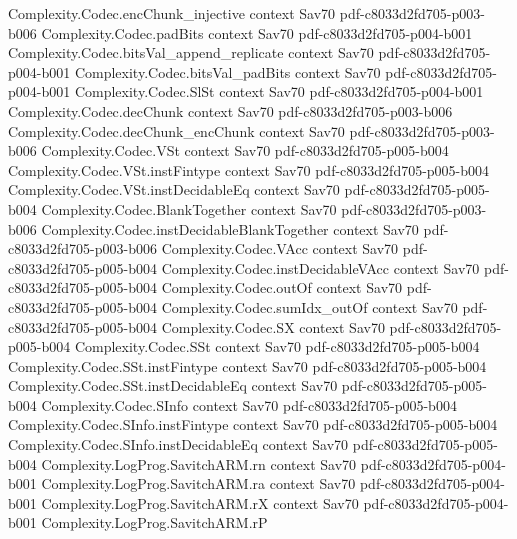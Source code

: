\begin{theorem}
  {Complexity.Codec.encChunk_injective}
  {context}
  {Sav70}
  {pdf-c8033d2fd705-p003-b006}
\proofstep
  {Complexity.Codec.padBits}
  {context}
  {Sav70}
  {pdf-c8033d2fd705-p004-b001}
\proofstep
  {Complexity.Codec.bitsVal_append_replicate}
  {context}
  {Sav70}
  {pdf-c8033d2fd705-p004-b001}
\proofstep
  {Complexity.Codec.bitsVal_padBits}
  {context}
  {Sav70}
  {pdf-c8033d2fd705-p004-b001}
\proofstep
  {Complexity.Codec.SlSt}
  {context}
  {Sav70}
  {pdf-c8033d2fd705-p004-b001}
\proofstep
  {Complexity.Codec.decChunk}
  {context}
  {Sav70}
  {pdf-c8033d2fd705-p003-b006}
\proofstep
  {Complexity.Codec.decChunk_encChunk}
  {context}
  {Sav70}
  {pdf-c8033d2fd705-p003-b006}
\proofstep
  {Complexity.Codec.VSt}
  {context}
  {Sav70}
  {pdf-c8033d2fd705-p005-b004}
\proofstep
  {Complexity.Codec.VSt.instFintype}
  {context}
  {Sav70}
  {pdf-c8033d2fd705-p005-b004}
\proofstep
  {Complexity.Codec.VSt.instDecidableEq}
  {context}
  {Sav70}
  {pdf-c8033d2fd705-p005-b004}
\proofstep
  {Complexity.Codec.BlankTogether}
  {context}
  {Sav70}
  {pdf-c8033d2fd705-p003-b006}
\proofstep
  {Complexity.Codec.instDecidableBlankTogether}
  {context}
  {Sav70}
  {pdf-c8033d2fd705-p003-b006}
\proofstep
  {Complexity.Codec.VAcc}
  {context}
  {Sav70}
  {pdf-c8033d2fd705-p005-b004}
\proofstep
  {Complexity.Codec.instDecidableVAcc}
  {context}
  {Sav70}
  {pdf-c8033d2fd705-p005-b004}
\proofstep
  {Complexity.Codec.outOf}
  {context}
  {Sav70}
  {pdf-c8033d2fd705-p005-b004}
\proofstep
  {Complexity.Codec.sumIdx_outOf}
  {context}
  {Sav70}
  {pdf-c8033d2fd705-p005-b004}
\proofstep
  {Complexity.Codec.SX}
  {context}
  {Sav70}
  {pdf-c8033d2fd705-p005-b004}
\proofstep
  {Complexity.Codec.SSt}
  {context}
  {Sav70}
  {pdf-c8033d2fd705-p005-b004}
\proofstep
  {Complexity.Codec.SSt.instFintype}
  {context}
  {Sav70}
  {pdf-c8033d2fd705-p005-b004}
\proofstep
  {Complexity.Codec.SSt.instDecidableEq}
  {context}
  {Sav70}
  {pdf-c8033d2fd705-p005-b004}
\proofstep
  {Complexity.Codec.SInfo}
  {context}
  {Sav70}
  {pdf-c8033d2fd705-p005-b004}
\proofstep
  {Complexity.Codec.SInfo.instFintype}
  {context}
  {Sav70}
  {pdf-c8033d2fd705-p005-b004}
\proofstep
  {Complexity.Codec.SInfo.instDecidableEq}
  {context}
  {Sav70}
  {pdf-c8033d2fd705-p005-b004}
\proofstep
  {Complexity.LogProg.SavitchARM.rn}
  {context}
  {Sav70}
  {pdf-c8033d2fd705-p004-b001}
\proofstep
  {Complexity.LogProg.SavitchARM.ra}
  {context}
  {Sav70}
  {pdf-c8033d2fd705-p004-b001}
\proofstep
  {Complexity.LogProg.SavitchARM.rX}
  {context}
  {Sav70}
  {pdf-c8033d2fd705-p004-b001}
\proofstep
  {Complexity.LogProg.SavitchARM.rP}

\end{theorem}
